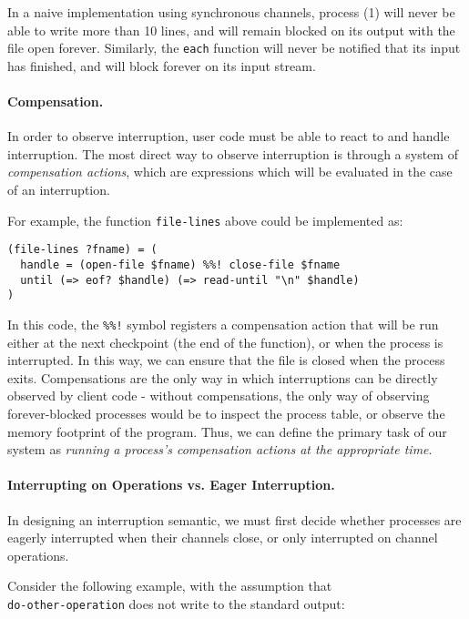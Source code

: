\documentclass[format=sigconf, review=true, draft=true, screen=true]{acmart}
\begin{document}
In a naive implementation using synchronous channels, process (1) will never be able to write more than 10 lines, and will remain blocked on its output with the file open forever.
Similarly, the \verb/each/ function will never be notified that its input has finished, and will block forever on its input stream.

\paragraph{Compensation.} In order to observe interruption, user code must be able to react to and handle interruption. The most direct way to observe interruption is through a system of \emph{compensation actions}, which are expressions which will be evaluated in the case of an interruption.

For example, the function \verb/file-lines/ above could be implemented as:

\begin{verbatim}
(file-lines ?fname) = (
  handle = (open-file $fname) %%! close-file $fname
  until (=> eof? $handle) (=> read-until "\n" $handle)
)
\end{verbatim}

In this code, the \verb/%%!/ symbol registers a compensation action that will be run either at the next checkpoint (the end of the function), or when the process is interrupted. In this way, we can ensure that the file is closed when the process exits. Compensations are the only way in which interruptions can be directly observed by client code - without compensations, the only way of observing forever-blocked processes would be to inspect the process table, or observe the memory footprint of the program. Thus, we can define the primary task of our system as \emph{running a process's compensation actions at the appropriate time}.

\paragraph{Interrupting on Operations vs. Eager Interruption.}

In designing an interruption semantic, we must first decide whether processes are eagerly interrupted when their channels close, or only interrupted on channel operations.

Consider the following example, with the assumption that \\ \verb/do-other-operation/ does not write to the standard output:
\end{document}

